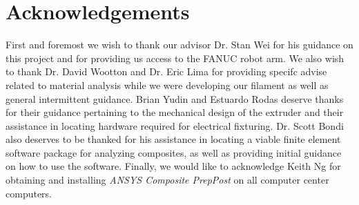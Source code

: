 \section{Acknowledgements}

\indent

First and foremost we wish to thank our advisor Dr. Stan Wei for his guidance on this project and for providing us access to the FANUC robot arm. We also wish to thank Dr. David Wootton and Dr. Eric Lima for providing specifc advise related to material analysis while we were developing our filament as well as general intermittent guidance. Brian Yudin and Estuardo Rodas deserve thanks for their guidance pertaining to the mechanical design of the extruder and their assistance in locating hardware required for electrical fixturing. Dr. Scott Bondi also deserves to be thanked for his assistance in locating a viable finite element software package for analyzing composites, as well as providing initial guidance on how to use the software. Finally, we would like to acknowledge Keith Ng for obtaining and installing \emph{ANSYS Composite PrepPost} on all computer center computers.

